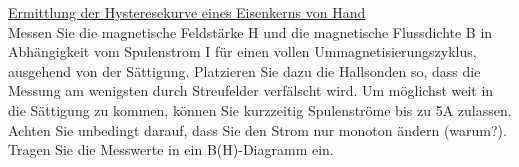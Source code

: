 \underline{Ermittlung der Hysteresekurve eines Eisenkerns von Hand}\\
Messen Sie die magnetische Feldstärke H und die magnetische Flussdichte B in Abhängigkeit vom
Spulenstrom I für einen vollen Ummagnetisierungszyklus, ausgehend von der Sättigung. Platzieren
Sie dazu die Hallsonden so, dass die Messung am wenigsten durch Streufelder verfälscht wird.
Um möglichst weit in die Sättigung zu kommen, können Sie kurzzeitig Spulenströme bis zu 5A
zulassen. Achten Sie unbedingt darauf, dass Sie den Strom nur monoton ändern (warum?). Tragen Sie die Messwerte in ein B(H)-Diagramm ein.

